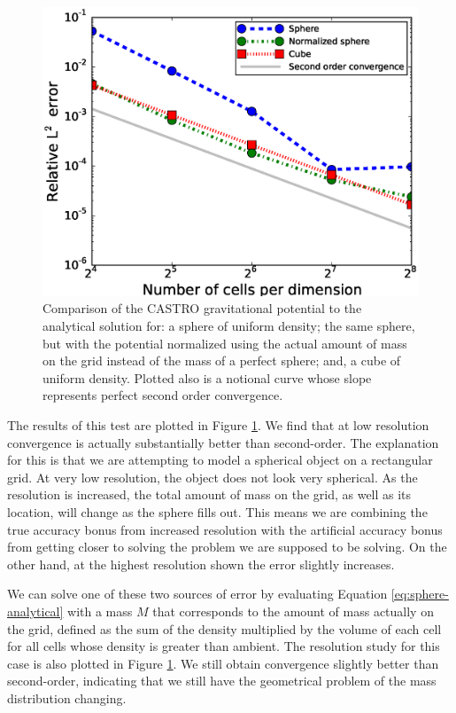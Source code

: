 \documentclass{emulateapj}
\begin{document}
\begin{figure}
  \centering
  \includegraphics[scale=0.45]{plots/phi_comparison}
  \caption{Comparison of the CASTRO gravitational potential to the analytical solution for: 
    a sphere of uniform density; the same sphere, but with the potential normalized using the 
    actual amount of mass on the grid instead of the mass of a perfect sphere; and, a 
    cube of uniform density. Plotted also is a notional curve whose slope represents
    perfect second order convergence.\label{fig:gravity_convergence}}
\end{figure}

The results of this test are plotted in Figure
\ref{fig:gravity_convergence}. We find that at low resolution 
convergence is actually substantially better than second-order. The 
explanation for this is that we are attempting to model a spherical 
object on a rectangular grid. At very low resolution, the object does 
not look very spherical. As the resolution is increased, the total 
amount of mass on the grid, as well as its location, will change 
as the sphere fills out. This means we are combining the true accuracy 
bonus from increased resolution with the artificial accuracy bonus 
from getting closer to solving the problem we are supposed to be solving. 
On the other hand, at the highest resolution shown the error slightly increases.

We can solve one of these two sources of error by evaluating Equation
\ref{eq:sphere-analytical} with a mass $M$ that corresponds to the
amount of mass actually on the grid, defined as the sum of the density
multiplied by the volume of each cell for all cells whose density is 
greater than ambient. The resolution study for this case is also
plotted in Figure \ref{fig:gravity_convergence}. We still obtain
convergence slightly better than second-order, indicating that we 
still have the geometrical problem of the mass distribution changing.
\end{document}
